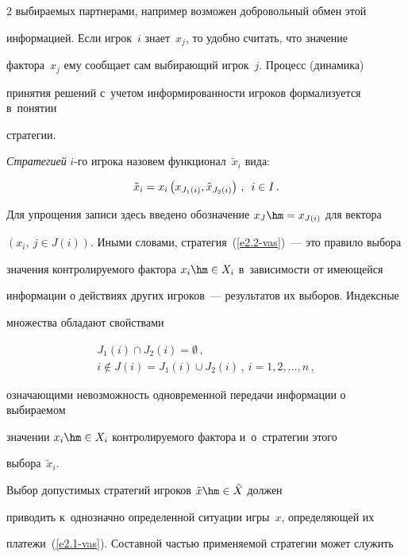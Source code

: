 \begin{multicols}{2}
выбираемых партнерами, например возможен добровольный обмен этой

информацией. Если игрок~$i$ знает~$x_j$, то удобно считать, что значение

фактора~$x_j$ ему сообщает сам выбирающий игрок~$j$. Процесс (динамика)

принятия решений с~учетом информированности игроков формализуется в~понятии

стратегии.



    \textit{Стратегией} $i$-го игрока назовем функционал~$\tilde{x}_i$ вида:

    \begin{equation}

    \tilde{x}_i= x_i\left( x_{J_1(i)}, \tilde{x}_{J_2(i)}\right)\,,\enskip i\in I\,.

    \label{e2.2-vas}

    \end{equation}

Для упрощения записи здесь введено обозначение $x_J\hm= x_{J(i)}$ для вектора

$(x_i,\ j\in J(i))$. Иными словами, стратегия~(\ref{e2.2-vas})~--- это правило выбора

значения контролируемого фактора $x_i\hm\in X_i$ в~зависимости от имеющейся

информации о действиях других игроков~--- результатов их выборов. Индексные

множества обладают свойствами

\begin{multline*}

J_1(i)\cap  J_2(i)=\emptyset\,,\\

 i\not\in J(i) =J_1(i)\cup J_2(i)\,,\ i=1,2,\ldots, n\,,

\end{multline*}

означающими невозможность одновременной передачи информации о выбираемом

значении $x_i\hm\in X_i$ контролируемого фактора и~о~стратегии этого

выбора~$\tilde{x}_i$.



    Выбор допустимых стратегий игроков $\tilde{x}\hm\in \tilde{X}$ должен

приводить к~однозначно определенной ситуации игры~$x$, определяющей их

платежи~(\ref{e2.1-vas}). Состав\-ной частью применяемой стратегии может служить


\end{multicols}
